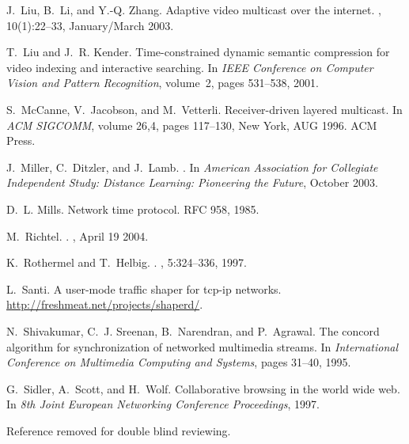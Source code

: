 \documentclass{sig-alternate}
\begin{document}
\begin{thebibliography}{10}
J.~Liu, B.~Li, and Y.-Q. Zhang.
\newblock Adaptive video multicast over the internet.
, 10(1):22--33, January/March 2003.

T.~Liu and J.~R. Kender.
\newblock Time-constrained dynamic semantic compression for video indexing and
  interactive searching.
\newblock In {\em IEEE Conference on Computer Vision and Pattern Recognition},
  volume~2, pages 531--538, 2001.

S.~McCanne, V.~Jacobson, and M.~Vetterli.
\newblock Receiver-driven layered multicast.
\newblock In {\em {ACM} {SIGCOMM}}, volume 26,4, pages 117--130, New York, AUG
  1996. ACM Press.

J.~Miller, C.~Ditzler, and J.~Lamb.
.
\newblock In {\em American Association for Collegiate Independent Study:
  Distance Learning: Pioneering the Future}, October 2003.

D.~L. Mills.
\newblock Network time protocol.
\newblock RFC 958, 1985.

M.~Richtel.
.
, April 19 2004.

K.~Rothermel and T.~Helbig.
.
, 5:324--336, 1997.

L.~Santi.
\newblock A user-mode traffic shaper for tcp-ip networks.
\newblock \url{http://freshmeat.net/projects/shaperd/}.

N.~Shivakumar, C.~J. Sreenan, B.~Narendran, and P.~Agrawal.
\newblock The concord algorithm for synchronization of networked multimedia
  streams.
\newblock In {\em International Conference on Multimedia Computing and
  Systems}, pages 31--40, 1995.

G.~Sidler, A.~Scott, and H.~Wolf.
\newblock Collaborative browsing in the world wide web.
\newblock In {\em 8th Joint European Networking Conference Proceedings}, 1997.

Reference removed for double blind reviewing.


\end{thebibliography}
\end{document}

